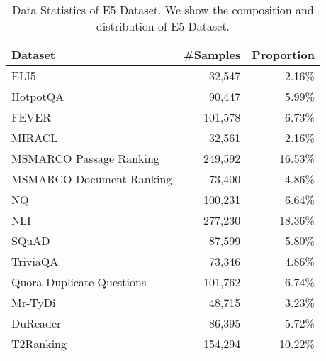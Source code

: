 \begin{table*}[t]
\centering
\small
\begin{tabular}{l|r|r} %
\hline
\textbf{Dataset} & \textbf{\#Samples} & \textbf{Proportion} \\ \hline
ELI5 \cite{fan2019eli5longformquestion} & 32,547&2.16\% \\
HotpotQA \cite{yang2018hotpotqadatasetdiverseexplainable} &90,447&5.99\% \\
FEVER \cite{thorne-etal-2018-fever} & 101,578&6.73\% \\
MIRACL \cite{zhang-etal-2023-miracl} & 32,561& 2.16\%\\
MSMARCO Passage Ranking \cite{bajaj2018msmarcohumangenerated} & 249,592&16.53\% \\
MSMARCO Document Ranking \cite{bajaj2018msmarcohumangenerated} & 73,400&4.86\% \\
NQ \cite{kwiatkowski-etal-2019-natural} & 100,231&6.64\% \\
NLI \cite{gao-etal-2021-simcse} & 277,230&18.36\% \\
SQuAD \cite{rajpurkar-etal-2016-squad} & 87,599&5.80\% \\
TriviaQA \cite{joshi2017triviaqa} & 73,346&4.86\% \\
Quora Duplicate Questions \cite{quora-question-pairs} & 101,762&6.74\% \\
Mr-TyDi \cite{zhang-etal-2021-mr} & 48,715&3.23\% \\
DuReader \cite{he-etal-2018-dureader} & 86,395 &5.72\% \\
T2Ranking \cite{10.1145/3539618.3591874} & 154,294&10.22\% \\ \hline
\end{tabular}
\caption{Data Statistics of E5 Dataset. We show the composition and distribution of E5 Dataset.}
\label{tab:train_dataset_details}
\end{table*}